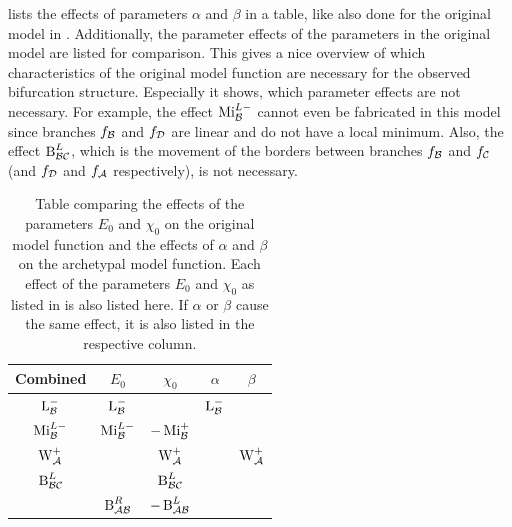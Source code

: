  lists the effects of parameters $\alpha$ and $\beta$ in a table, like also done for the original model in .
Additionally, the parameter effects of the parameters in the original model are listed for comparison.
This gives a nice overview of which characteristics of the original model function are necessary for the observed bifurcation structure.
Especially it shows, which parameter effects are not necessary.
For example, the effect $\operatorname{Mi}_{\mathcal{B}}^{L-}$ cannot even be fabricated in this model since branches $f_{\mathcal{B}}$ and $f_{\mathcal{D}}$ are linear and do not have a local minimum.
Also, the effect $\operatorname{B}_{\mathcal{B}\mathcal{C}}^L$, which is the movement of the borders between branches $f_{\mathcal{B}}$ and $f_{\mathcal{C}}$ (and $f_{\mathcal{D}}$ and $f_{\mathcal{A}}$ respectively), is not necessary.

\begin{table}
	\centering
	\begin{tabular}{|c||c|c||c|c|} \hline
		Combined         & $E_0$            & $\chi_0$          & $\alpha$     & $\beta$        \\ \hline \hline
		$\operatorname{L}_{\mathcal{B}}^{-}$   & $\operatorname{L}_{\mathcal{B}}^{-}$   &                   & $\operatorname{L}_{\mathcal{B}}^-$ &                \\ \hline
		$\operatorname{Mi}_{\mathcal{B}}^{L-}$ & $\operatorname{Mi}_{\mathcal{B}}^{L-}$ & $-\operatorname{Mi}_{\mathcal{B}}^{+}$  &              &                \\ \hline
		$\operatorname{W}_{\mathcal{A}}^{+}$   &                  & $\operatorname{W}_{\mathcal{A}}^{+}$    &              & $\operatorname{W}_{\mathcal{A}}^{+}$ \\ \hline \hline
		$\operatorname{B}_{\mathcal{B}\mathcal{C}}^{L}$ &                  & $\operatorname{B}_{\mathcal{B}\mathcal{C}}^{L}$  &              &                \\ \hline
		                 & $\operatorname{B}_{\mathcal{A}\mathcal{B}}^{R}$ & $-\operatorname{B}_{\mathcal{A}\mathcal{B}}^{L}$ &              &                \\ \hline
	\end{tabular}
	\caption[Comparison table of parameter effects in the piecewise hybrid quadratic model and the original model]{
		Table comparing the effects of the parameters $E_0$ and $\chi_0$ on the original model function and the effects of $\alpha$ and $\beta$ on the archetypal model function.
		Each effect of the parameters $E_0$ and $\chi_0$ as listed in  is also listed here.
		If $\alpha$ or $\beta$ cause the same effect, it is also listed in the respective column.
	}
	\label{table:setup.arch.paramfx}
\end{table}
